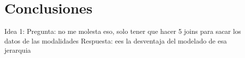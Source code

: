 \newpage
\section{Conclusiones}


Idea 1:
Pregunta: ⁠⁠⁠no me molesta eso, solo tener que hacer 5 joins para sacar los datos de las modalidades
Respuesta: e⁠es la desventaja del modelado de esa jerarquia

